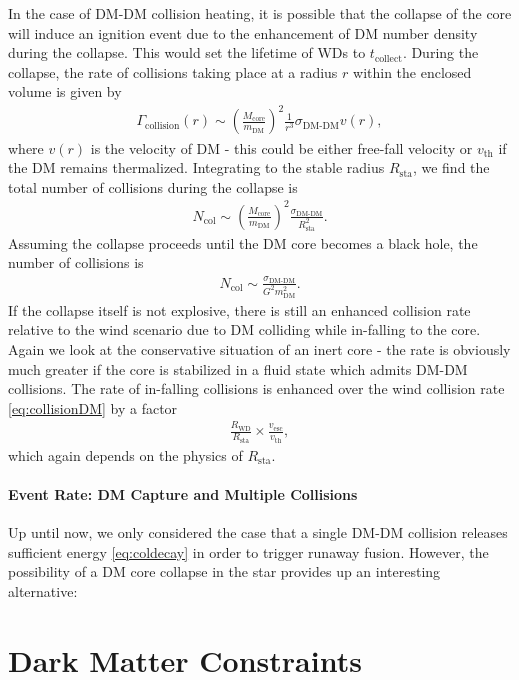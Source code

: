 \documentclass[twocolumn, preprintnumbers,amsmath,amssymb,prd, superscriptaddress]{revtex4}
\def\r{\right)}
\def\l{\left(}
\begin{document}
In the case of DM-DM collision heating, it is possible that the collapse of the core will induce an ignition event due to the enhancement of DM number density during the collapse.
This would set the lifetime of WDs to $t_\text{collect}$.
During the collapse, the rate of collisions taking place at a radius $r$ within the enclosed volume is given by
\begin{align}
\Gamma_\text{collision}(r) \sim \l \frac{M_\text{core}}{m_\text{DM}} \r^2 \frac{1}{r^3} \sigma_\text{DM-DM} v(r),
\end{align}
where $v(r)$ is the velocity of DM - this could be either free-fall velocity or $v_\text{th}$ if the DM remains thermalized.
Integrating to the stable radius $R_\text{sta}$, we find the total number of collisions during the collapse is
\begin{align}
  N_\text{col} \sim \l \frac{M_\text{core}}{m_\text{DM}} \r^2 \frac{\sigma_\text{DM-DM}}{R_\text{sta}^2}.
 \end{align}
Assuming the collapse proceeds until the DM core becomes a black hole, the number of collisions is
\begin{align}
  N_\text{col} \sim \frac{\sigma_\text{DM-DM}}{G^2 m_\text{DM}^2}.
 \end{align}
If the collapse itself is not explosive, there is still an enhanced collision rate relative to the wind scenario due to DM colliding while in-falling to the core.
Again we look at the conservative situation of an inert core - the rate is obviously much greater if the core is stabilized in a fluid state which admits DM-DM collisions.
The rate of in-falling collisions is enhanced over the wind collision rate \eqref{eq:collisionDM} by a factor
\begin{align}
\label{eq:enhancecollision}
   \frac{R_\text{WD}}{R_\text{sta}} \times \frac{v_\text{esc}}{v_\text{th}},
\end{align}
which again depends on the physics of $R_\text{sta}$.

\paragraph{Event Rate: DM Capture and Multiple Collisions}

Up until now, we only considered the case that a single DM-DM collision releases sufficient energy \eqref{eq:coldecay} in order to trigger runaway fusion.
However, the possibility of a DM core collapse in the star provides up an interesting alternative:

\section{Dark Matter Constraints}
\label{sec:Constraints}
\end{document}
